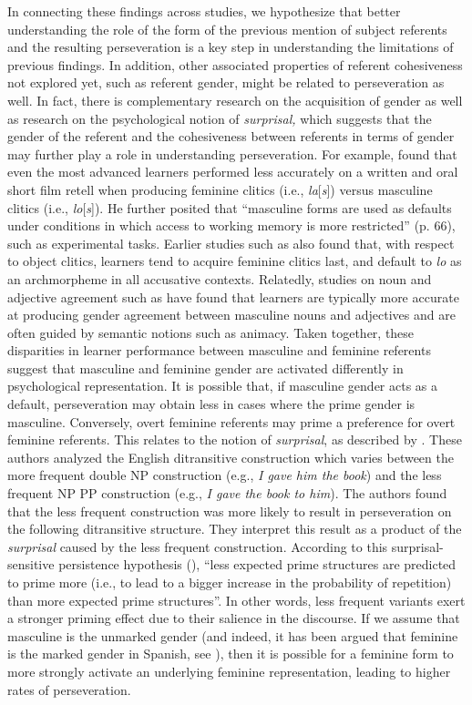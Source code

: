 \documentclass[output=paper]{langscibook}
\begin{document}
In connecting these findings across studies, we hypothesize that better understanding the role of the form of the previous mention of subject referents and the resulting perseveration is a key step in understanding the limitations of previous findings. In addition, other associated properties of referent cohesiveness not explored yet, such as referent gender, might be related to perseveration as well. In fact, there is complementary research on the acquisition of gender as well as research on the psychological notion of \textit{surprisal,} which suggests that the gender of the referent and the cohesiveness between referents in terms of gender may further play a role in understanding perseveration. For example, \citet{Malovrh2014} found that even the most advanced learners performed less accurately on a written and oral short film retell when producing feminine clitics (i.e., \textit{la}[\textit{s}]) versus masculine clitics (i.e., \textit{lo}[\textit{s}]). He further posited that “masculine forms are used as defaults under conditions in which access to working memory is more restricted” (p. 66), such as experimental tasks. Earlier studies such as \citet{Klee1989} also found that, with respect to object clitics, learners tend to acquire feminine clitics last, and default to \textit{lo} as an archmorpheme in all accusative contexts. Relatedly, studies on noun and adjective agreement such as \citet{Alarcón2010} have found that learners are typically more accurate at producing gender agreement between masculine nouns and adjectives and are often guided by semantic notions such as animacy. Taken together, these disparities in learner performance between masculine and feminine referents suggest that masculine and feminine gender are activated differently in psychological representation. It is possible that, if masculine gender acts as a default, perseveration may obtain less in cases where the prime gender is masculine. Conversely, overt feminine referents may prime a preference for overt feminine referents. This relates to the notion of \textit{surprisal}, as described by \citet{Jaeger2007}. These authors analyzed the English ditransitive construction which varies between the more frequent double NP construction (e.g., \textit{I gave him the book}) and the less frequent NP PP construction (e.g., \textit{I gave the book to him}). The authors found that the less frequent construction was more likely to result in perseveration on the following ditransitive structure. They interpret this result as a product of the \textit{surprisal} caused by the less frequent construction. According to this surprisal-sensitive persistence hypothesis (\citealt[3]{Jaeger2007}), “less expected prime structures are predicted to prime more (i.e., to lead to a bigger increase in the probability of repetition) than more expected prime structures”. In other words, less frequent variants exert a stronger priming effect due to their salience in the discourse. If we assume that masculine is the unmarked gender (and indeed, it has been argued that feminine is the marked gender in Spanish, see \citealt{Beatty-MartínezDussias2019,Harris1991}), then it is possible for a feminine form to more strongly activate an underlying feminine representation, leading to higher rates of perseveration.
\end{document}
